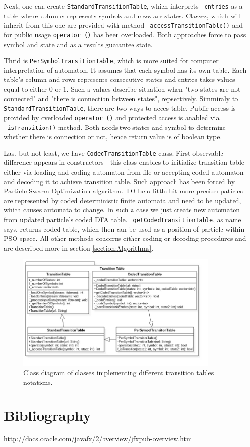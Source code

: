 \documentclass{article}
\begin{document}
Next, one can create \texttt{StandardTransitionTable}, which interprets \texttt{\_entries} as a table where columns represents symbols and rows are states. Classes, which will inherit from this one are provided with method \texttt{\_accessTransitionTable()} and for public usage \texttt{operator ()} has been overloaded. Both approaches force to pass symbol and state and as a results guarantee state. 

Thrid  is \texttt{PerSymbolTransitionTable}, which is more suited for computer interpretation of automaton. It assumes that each symbol has its own table. Each table's column and rows represents consecutive states and entries takes values equal to either $0$ or $1$. Such a values describe situation when "two states are not connected" and "there is connection between states", repsectively. Simmiraly to \texttt{StandardTransitionTable}, there are two ways to acces table. Public access is provided by overloaded \texttt{operator ()} and protected access is anabled via \texttt{\_isTransition()} method. Both needs two states and symbol to determine whether there is connection or not, hence return value is of boolean type.

Last but not least, we have \texttt{CodedTransitionTable} class. First observable difference appears in constructors - this class enables to initialize transition table either via loading and coding automaton from file or accepting coded automaton and decoding it to achieve transition table. Such approach has been forced by Particle Swarm Optimization algorithm. TO be a little bit more precise: paticles are represented by coded deterministic finite automata and need to be updated, which causes automata to change. In such a case we just create new automaton from updated particle's coded DFA table. \texttt{\_getCodedTransitionTable}, as name says, returns coded table, which then can be used as a position of particle within PSO space. All other methods concerns either coding or decoding procedures and are described more in section \ref{section:Algorithms}.




\begin{figure}[H]
	\centering
	\includegraphics[width=0.9\textwidth]{images/transition_table.jpg}
    \caption{Class diagram of classes implementing different transition tables notations.}
    \label{fig:trans_table_class}
\end{figure}


\section{Bibliography}

\begin{thebibliography}{1}
	 \url{http://docs.oracle.com/javafx/2/overview/jfxpub-overview.htm}	
\end{thebibliography}
\end{document}
